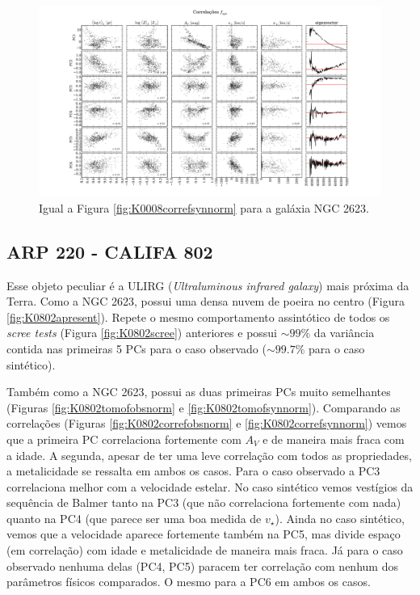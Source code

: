 \begin{figure}
    \includegraphics[width=1.2\textwidth, angle=-90]{figuras/K0213-correl-f_syn_norm-PCvsPhys.pdf}
	\caption[Correlações PCs vs. par\^ametros f\'isicos - $f_{syn}$ - NGC 2623.]
	{Igual a Figura \ref{fig:K0008correfsynnorm} para a galáxia NGC 2623.}
    \label{fig:K0213correfsynnorm}
\end{figure}

\subsection{ARP 220 - CALIFA 802}

Esse objeto peculiar é a ULIRG ({\em Ultraluminous infrared galaxy}) mais próxima da Terra. Como a NGC 2623, possui uma
densa nuvem de poeira no centro (Figura \ref{fig:K0802apresent}). Repete o mesmo comportamento assintótico de todos os
{\em scree tests} (Figura \ref{fig:K0802scree}) anteriores e possui $\sim 99\%$ da variância contida nas primeiras 5 PCs
para o caso observado ($\sim 99.7\%$ para o caso sintético).

Também como a NGC 2623, possui as duas primeiras PCs muito semelhantes (Figuras \ref{fig:K0802tomofobsnorm} e
\ref{fig:K0802tomofsynnorm}). Comparando as correlações (Figuras \ref{fig:K0802correfobsnorm} e
\ref{fig:K0802correfsynnorm}) vemos que a primeira PC correlaciona fortemente com $A_V$ e de maneira mais fraca com a
idade. A segunda, apesar de ter uma leve correlação com todos as propriedades, a metalicidade se ressalta em ambos os
casos. Para o caso observado a PC3 correlaciona melhor com a velocidade estelar. No caso sintético vemos vestígios da
sequência de Balmer tanto na PC3 (que não correlaciona fortemente com nada) quanto na PC4 (que parece ser uma boa medida
de $v_\star$). Ainda no caso sintético, vemos que a velocidade aparece fortemente também na PC5, mas divide espaço (em
correlação) com idade e metalicidade de maneira mais fraca. Já para o caso observado nenhuma delas (PC4, PC5) paracem
ter correlação com nenhum dos parâmetros físicos comparados. O mesmo para a PC6 em ambos os casos.

